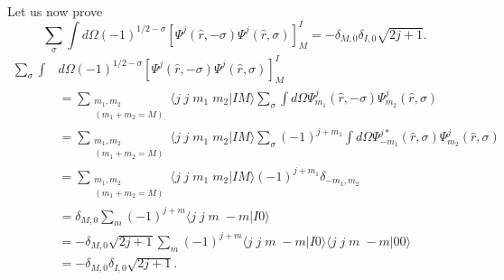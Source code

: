 \begin{subappendices}
Let us now prove
\begin{equation}\label{eq16}
\sum_\sigma \int d\Omega (-1)^{1/2-\sigma}
\left[ \Psi^{j}(\hat r,-\sigma)\Psi^{j}(\hat r,\sigma) \right]^{I}_{M}=-\delta_{M,0}\delta_{I,0}\sqrt{2j+1}.
\end{equation}
\begin{equation}\label{eq17}
\begin{split}
\sum_\sigma \int &d\Omega (-1)^{1/2-\sigma}
\left[ \Psi^{j}(\hat r,-\sigma)\Psi^{j}(\hat r,\sigma) \right]^{I}_{M}\\
&=\sum_{\substack{m_1,m_2\\(m_1+m_2=M)}} \langle j\; j \; m_1\;m_2 | I M\rangle \sum_\sigma
 \int d\Omega \Psi_{m_1}^{j}(\hat r,-\sigma)\Psi_{m_2}^{j}(\hat r,\sigma)\\
&=\sum_{\substack{m_1,m_2\\(m_1+m_2=M)}} \langle j\; j \; m_1\;m_2 | I M\rangle \sum_\sigma (-1)^{j+m_1}
 \int d\Omega \Psi_{-m_1}^{j*}(\hat r,\sigma)\Psi_{m_2}^{j}(\hat r,\sigma)\\
&=\sum_{\substack{m_1,m_2\\(m_1+m_2=M)}} \langle j\; j \; m_1\;m_2 | I M\rangle  (-1)^{j+m_1}
 \delta_{-m_1,m_2}\\
&= \delta_{M,0} \sum_m (-1)^{j+m} \langle j\; j \; m\;-m | I 0\rangle  \\
&= -\delta_{M,0}\sqrt{2j+1} \sum_m (-1)^{j+m} \langle j\; j \; m\;-m | I 0\rangle
\langle j\; j \; m\;-m | 0 0\rangle   \\
&=-\delta_{M,0}\delta_{I,0}\sqrt{2j+1}.
\end{split}
\end{equation}


\end{subappendices}
